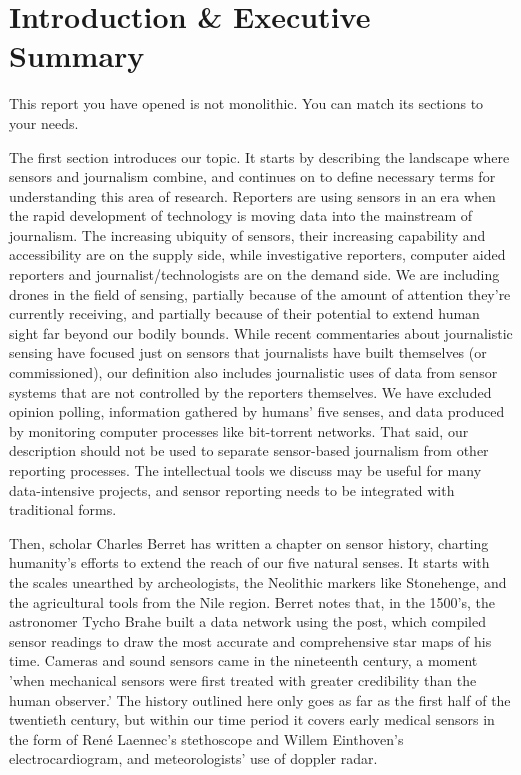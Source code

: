 

\chapter{Introduction & Executive Summary}
This report you have opened is not monolithic. You can match its sections
to your needs.

The first section introduces our topic. It starts by describing the landscape
where sensors and journalism combine, and continues on to define necessary
terms for understanding this area of research. Reporters are using
sensors in an era when the rapid development of technology is moving data
into the mainstream of journalism. The increasing ubiquity of sensors, their
increasing capability and accessibility are on the supply side, while investigative
reporters, computer aided reporters and journalist/technologists
are on the demand side. We are including drones in the field of sensing,
partially because of the amount of attention they're currently receiving,
and partially because of their potential to extend human sight far beyond
our bodily bounds. While recent commentaries about journalistic sensing
have focused just on sensors that journalists have built themselves (or commissioned),
our definition also includes journalistic uses of data from sensor
systems that are not controlled by the reporters themselves. We have
excluded opinion polling, information gathered by humans' five senses, and
data produced by monitoring computer processes like bit-torrent networks.
That said, our description should not be used to separate sensor-based journalism
from other reporting processes. The intellectual tools we discuss
may be useful for many data-intensive projects, and sensor reporting needs
to be integrated with traditional forms.

Then, scholar Charles Berret has written a chapter on sensor history, charting
humanity's efforts to extend the reach of our five natural senses. It starts
with the scales unearthed by archeologists, the Neolithic markers like Stonehenge,
and the agricultural tools from the Nile region. Berret notes that,
in the 1500's, the astronomer Tycho Brahe built a data network using the
post, which compiled sensor readings to draw the most accurate and comprehensive
star maps of his time. Cameras and sound sensors came in the
nineteenth century, a moment 'when mechanical sensors were first treated
with greater credibility than the human observer.' The history outlined here
only goes as far as the first half of the twentieth century, but within our time
period it covers early medical sensors in the form of René Laennec's stethoscope
and Willem Einthoven's electrocardiogram, and meteorologists' use
of doppler radar.

